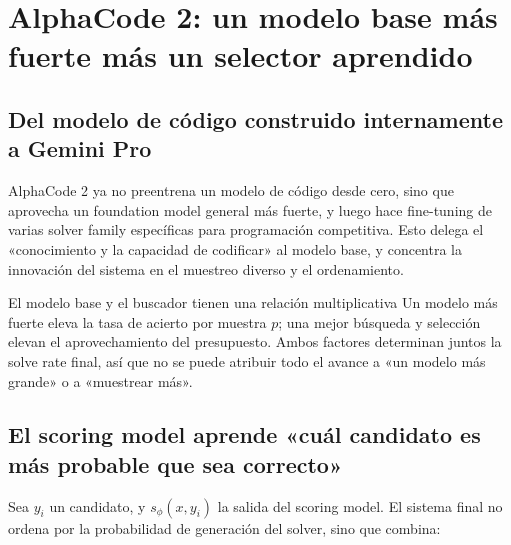 \section{AlphaCode 2: un modelo base más fuerte más un selector aprendido}

\subsection{Del modelo de código construido internamente a Gemini Pro}


AlphaCode 2 ya no preentrena un modelo de código desde cero, sino que aprovecha un foundation model general más fuerte, y luego hace fine-tuning de varias solver family específicas para programación competitiva. Esto delega el «conocimiento y la capacidad de codificar» al modelo base, y concentra la innovación del sistema en el muestreo diverso y el ordenamiento.


\begin{importantbox}{El modelo base y el buscador tienen una relación multiplicativa}
Un modelo más fuerte eleva la tasa de acierto por muestra $p$; una mejor búsqueda y selección elevan el aprovechamiento del presupuesto. Ambos factores determinan juntos la solve rate final, así que no se puede atribuir todo el avance a «un modelo más grande» o a «muestrear más».
\end{importantbox}

\subsection{El scoring model aprende «cuál candidato es más probable que sea correcto»}


Sea $y_i$ un candidato, y $s_\phi(x,y_i)$ la salida del scoring model. El sistema final no ordena por la probabilidad de generación del solver, sino que combina:

